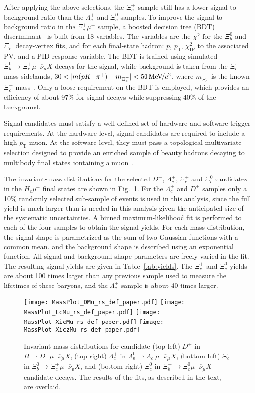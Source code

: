 \documentclass[12pt,a4paper]{article}
\def\Pmu         {\ensuremath{\upmu}\xspace}
\def\Pnu         {\ensuremath{\upnu}\xspace}
\def\Ppi         {\ensuremath{\uppi}\xspace}
\def\PXi         {\ensuremath{\Xi}\xspace}
\def\PLambda     {\ensuremath{\Lambda}\xspace}
\def\PD      {\ensuremath{\mathrm{D}}\xspace}
\def\PK      {\ensuremath{\mathrm{K}}\xspace}
\def\Pb      {\ensuremath{\mathrm{b}}\xspace}
\def\Pc      {\ensuremath{\mathrm{c}}\xspace}
\def\Pmu         {\ensuremath{\mu}\xspace}
\def\Pnu         {\ensuremath{\nu}\xspace}
\def\Ppi         {\ensuremath{\pi}\xspace}
\def\PD      {\ensuremath{D}\xspace}
\def\PK      {\ensuremath{K}\xspace}
\def\Pb      {\ensuremath{b}\xspace}
\def\Pc      {\ensuremath{c}\xspace}
\def\mun        {{\ensuremath{\Pmu^-}}\xspace} \def\mupm       {{\ensuremath{\Pmu^\pm}}\xspace}
\def\neub       {{\ensuremath{\overline{\Pnu}}}\xspace}
\def\neumb      {{\ensuremath{\neub_\mu}}\xspace}
\def\cquark    {{\ensuremath{\Pc}}\xspace}
\def\bquark    {{\ensuremath{\Pb}}\xspace}
\def\pion   {{\ensuremath{\Ppi}}\xspace}
\def\pip    {{\ensuremath{\pion^+}}\xspace}
\def\kaon    {{\ensuremath{\PK}}\xspace}
\def\Km      {{\ensuremath{\kaon^-}}\xspace}
\def\D       {{\ensuremath{\PD}}\xspace}
\def\Dp      {{\ensuremath{\D^+}}\xspace}
\def\Lz          {{\ensuremath{\PLambda}}\xspace}
\def\Xires       {{\ensuremath{\PXi}}\xspace}
\def\Lc          {{\ensuremath{\Lz^+_\cquark}}\xspace}
\def\Xicz        {{\ensuremath{\Xires^0_\cquark}}\xspace}
\def\Xicp        {{\ensuremath{\Xires^+_\cquark}}\xspace}
\def\Lb           {{\ensuremath{\Lz^0_\bquark}}\xspace}
\def\Xibz         {{\ensuremath{\Xires^0_\bquark}}\xspace}
\def\Xibm         {{\ensuremath{\Xires^-_\bquark}}\xspace}
\def\to                 {\ensuremath{\rightarrow}\xspace}
\newcommand{\aunit}[1]{\ensuremath{\text{\,#1}}}
\newcommand{\mevcc}{\ensuremath{\aunit{Me\kern -0.1em V\!/}c^2}\xspace}
\newcommand{\chisq}{\ensuremath{\chi^2}\xspace}
\newcommand{\chisqip}{\ensuremath{\chi^2_{\text{IP}}}\xspace}
\def\pt         {\ensuremath{p_{\mathrm{T}}}\xspace}
\begin{document}
After applying the above selections, the $\Xicp$ sample still has a lower signal-to-background ratio than the $\Lc$ and 
$\Xicz$ samples.
To improve the signal-to-background ratio in the $\Xicp\mun$ sample, a boosted decision tree (BDT) 
discriminant~\cite{Breiman, AdaBoost} is built from 18 variables. The variables are the $\chisq$ for the $\Xibz$ and $\Xicp$ 
decay-vertex fits, and for each final-state hadron: $p$, $\pt$, $\chisqip$ to the associated PV, and a PID response variable.
The BDT is trained using simulated 
$\Xibz\to\Xicp\mun\neumb X$ decays for the signal, while background is taken from the $\Xicp$ mass sidebands, 
${30<|m(p\Km\pip)-m_{\Xicp}|<50\mevcc}$,
where $m_{\Xicp}$ is the known $\Xicp$ mass~\cite{PDG2018}. Only a loose requirement on the BDT is employed, which provides an
efficiency of about 97\% for signal decays while suppressing 40\% of the background.

Signal candidates must satisfy a well-defined set of 
hardware and software trigger requirements. At the hardware level, signal candidates are required to
include a high $\pt$ muon. At the software level, they must pass a topological multivariate selection 
designed to provide an enriched sample of beauty hadrons decaying to multibody final states containing a muon~\cite{BBDT}.

The invariant-mass distributions for the selected $\Dp$, $\Lc$, $\Xicp$ and $\Xicz$ candidates in the $H_c\mun$ final states 
are shown in Fig.~\ref{fig:MassPlots}. For the $\Lc$ and $\Dp$ samples only a 10\% randomly selected sub-sample of events is used 
in this analysis, since the full yield is much larger than is needed in this analysis given the anticipated size of the systematic 
uncertainties. A binned maximum-likelihood fit is performed to each of the four samples to obtain the signal yields.
For each mass distribution, the signal shape is parametrized as the sum of two Gaussian functions with a common mean, and the 
background shape is described using an exponential function. All signal and background shape parameters are freely varied in the fit. 
The resulting signal yields are given in Table~\ref{tab:yields}. The $\Xicp$ and $\Xicz$ yields are
about 100 times larger than any previous sample used to measure the lifetimes of these baryons, and the $\Lc$ sample is about 40 times
larger.

\begin{figure}[tb]
\centering
\texttt{[image: MassPlot\_DMu\_rs\_def\_paper.pdf]}
\texttt{[image: MassPlot\_LcMu\_rs\_def\_paper.pdf]}
\texttt{[image: MassPlot\_XicMu\_rs\_def\_paper.pdf]}
\texttt{[image: MassPlot\_XiczMu\_rs\_def\_paper.pdf]}
\caption{\small{Invariant-mass distributions for candidate (top left) $\Dp$ in $B\to\Dp\mun\neumb X$,
(top right) $\Lc$ in $\Lb\to\Lc\mun\neumb X$,
(bottom left) $\Xicp$ in ${\Xibz\to\Xicp\mun\neumb X}$, and
(bottom right) $\Xicz$ in ${\Xibm\to\Xicz\mun\neumb X}$ candidate decays.
The results of the fits, as described in the text, are overlaid.}}
\label{fig:MassPlots}
\end{figure}
\end{document}
